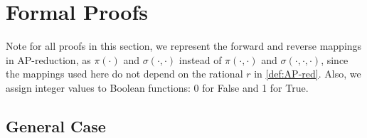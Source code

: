\section{Formal Proofs}\label{sec:formalproof}


Note for all proofs in this section, we represent the forward and reverse mappings in AP-reduction, as $\pi(\cdot)$ and $\sigma(\cdot,\cdot)$ instead of $\pi(\cdot,\cdot)$ and $\sigma(\cdot,\cdot,\cdot)$, since the mappings used here do not depend on the rational $r$ in \cref{def:AP-red}. Also, we assign integer values to Boolean functions: 0 for False and 1 for True.

\subsection{General Case}


